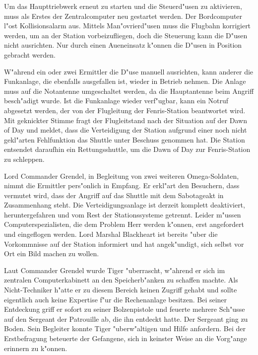 Um das Haupttriebwerk erneut zu starten und die Steuerd"usen zu aktivieren, muss als Erstes der Zentralcomputer neu gestartet werden. Der Bordcomputer l"ost Kollisionsalarm aus. Mittels Man"ovrierd"usen muss die Flugbahn korrigiert werden, um an der Station vorbeizufliegen, doch die Steuerung kann die D"usen nicht ausrichten. Nur durch einen Au\3eneinsatz k"onnen die D"usen in Position gebracht werden.

W"ahrend ein oder zwei Ermittler die D"use manuell ausrichten, kann anderer die Funkanlage, die ebenfalls ausgefallen ist, wieder in Betrieb nehmen. Die Anlage muss auf die Notantenne umgeschaltet werden, da die Hauptantenne beim Angriff besch"adigt wurde. Ist die Funkanlage wieder verf"ugbar, kann ein Notruf abgesetzt werden, der von der Flugleitung der Fenris-Station beantwortet wird. Mit geknickter Stimme fragt der Flugleitstand nach der Situation auf der Dawn of Day und meldet, dass die Verteidigung der Station aufgrund einer noch nicht gekl"arten Fehlfunktion das Shuttle unter Beschuss genommen hat. Die Station entsendet daraufhin ein Rettungsshuttle, um die Dawn of Day zur Fenris-Station zu schleppen.

Lord Commander Grendel, in Begleitung von zwei weiteren Omega-Soldaten, nimmt die Ermittler pers"onlich in Empfang. Er erkl"art den Besuchern, dass vermutet wird, dass der Angriff auf das Shuttle mit dem Sabotageakt in Zusammenhang steht. Die Verteidigungsanlage ist derzeit komplett deaktiviert, heruntergefahren und vom Rest der Stationssysteme getrennt. Leider m"ussen Computerspezialisten, die dem Problem Herr werden k"onnen, erst angefordert und eingeflogen werden. Lord Marshal Blackheart ist bereits "uber die Vorkommnisse auf der Station informiert und hat angek"undigt, sich selbst vor Ort ein Bild machen zu wollen.

Laut Commander Grendel wurde Tiger "uberrascht, w"ahrend er sich im zentralen Computerkabinett an den Speicherb"anken zu schaffen machte. Als Nicht-Techniker h"atte er zu diesem Bereich keinen Zugriff gehabt und sollte eigentlich auch keine Expertise f"ur die Rechenanlage besitzen. Bei seiner Entdeckung griff er sofort zu seiner Bolzenpistole und feuerte mehrere Sch"usse auf den Sergeant der Patrouille ab, die ihn entdeckt hatte. Der Sergeant ging zu Boden. Sein Begleiter konnte Tiger "uberw"altigen und Hilfe anfordern. Bei der Erstbefragung beteuerte der Gefangene, sich in keinster Weise an die Vorg"ange erinnern zu k"onnen.

